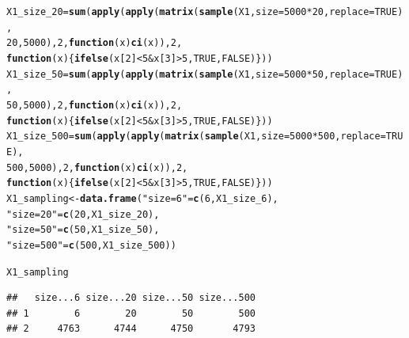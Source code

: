 \documentclass{article}\usepackage[]{graphicx}\usepackage[]{color}
\makeatletter
\newcommand{\hlnum}[1]{\textcolor[rgb]{0.686,0.059,0.569}{#1}}%
\newcommand{\hlstr}[1]{\textcolor[rgb]{0.192,0.494,0.8}{#1}}%
\newcommand{\hlopt}[1]{\textcolor[rgb]{0,0,0}{#1}}%
\newcommand{\hlstd}[1]{\textcolor[rgb]{0.345,0.345,0.345}{#1}}%
\newcommand{\hlkwa}[1]{\textcolor[rgb]{0.161,0.373,0.58}{\textbf{#1}}}%
\newcommand{\hlkwb}[1]{\textcolor[rgb]{0.69,0.353,0.396}{#1}}%
\newcommand{\hlkwc}[1]{\textcolor[rgb]{0.333,0.667,0.333}{#1}}%
\newcommand{\hlkwd}[1]{\textcolor[rgb]{0.737,0.353,0.396}{\textbf{#1}}}%
\newenvironment{kframe}{%
 \def\at@end@of@kframe{}%
 \ifinner\ifhmode%
  \def\at@end@of@kframe{\end{minipage}}%
  \begin{minipage}{\columnwidth}%
 \fi\fi%
 \def\FrameCommand##1{\hskip\@totalleftmargin \hskip-\fboxsep
 \colorbox{shadecolor}{##1}\hskip-\fboxsep
     \hskip-\linewidth \hskip-\@totalleftmargin \hskip\columnwidth}%
 \MakeFramed {\advance\hsize-\width
   \@totalleftmargin\z@ \linewidth\hsize
   \@setminipage}}%
 {\par\unskip\endMakeFramed%
 \at@end@of@kframe}
\newenvironment{knitrout}{}{} %
\makeatother
\begin{document}
\begin{knitrout}
\begin{kframe}
\begin{alltt}
\hlstd{X1_size_20} \hlkwb{=} \hlkwd{sum}\hlstd{(}\hlkwd{apply}\hlstd{(}\hlkwd{apply}\hlstd{(}\hlkwd{matrix}\hlstd{(}\hlkwd{sample}\hlstd{(X1,} \hlkwc{size} \hlstd{=} \hlnum{5000} \hlopt{*}\hlnum{20}\hlstd{,} \hlkwc{replace} \hlstd{=} \hlnum{TRUE}\hlstd{),}
                                   \hlnum{20}\hlstd{,}\hlnum{5000}\hlstd{),} \hlnum{2}\hlstd{,} \hlkwa{function}\hlstd{(}\hlkwc{x}\hlstd{)} \hlkwd{ci}\hlstd{(x)),} \hlnum{2}\hlstd{,}
                      \hlkwa{function}\hlstd{(}\hlkwc{x}\hlstd{)\{}\hlkwd{ifelse}\hlstd{(x[}\hlnum{2}\hlstd{]} \hlopt{<} \hlnum{5} \hlopt{&} \hlstd{x[}\hlnum{3}\hlstd{]} \hlopt{>} \hlnum{5}\hlstd{,} \hlnum{TRUE}\hlstd{,} \hlnum{FALSE}\hlstd{)\}))}
\hlstd{X1_size_50} \hlkwb{=} \hlkwd{sum}\hlstd{(}\hlkwd{apply}\hlstd{(}\hlkwd{apply}\hlstd{(}\hlkwd{matrix}\hlstd{(}\hlkwd{sample}\hlstd{(X1,} \hlkwc{size} \hlstd{=} \hlnum{5000} \hlopt{*}\hlnum{50}\hlstd{,} \hlkwc{replace} \hlstd{=} \hlnum{TRUE}\hlstd{),}
                                   \hlnum{50}\hlstd{,}\hlnum{5000}\hlstd{),} \hlnum{2}\hlstd{,} \hlkwa{function}\hlstd{(}\hlkwc{x}\hlstd{)} \hlkwd{ci}\hlstd{(x)),} \hlnum{2}\hlstd{,}
                      \hlkwa{function}\hlstd{(}\hlkwc{x}\hlstd{)\{}\hlkwd{ifelse}\hlstd{(x[}\hlnum{2}\hlstd{]} \hlopt{<} \hlnum{5} \hlopt{&} \hlstd{x[}\hlnum{3}\hlstd{]} \hlopt{>} \hlnum{5}\hlstd{,} \hlnum{TRUE}\hlstd{,} \hlnum{FALSE}\hlstd{)\}))}
\hlstd{X1_size_500} \hlkwb{=} \hlkwd{sum}\hlstd{(}\hlkwd{apply}\hlstd{(}\hlkwd{apply}\hlstd{(}\hlkwd{matrix}\hlstd{(}\hlkwd{sample}\hlstd{(X1,} \hlkwc{size} \hlstd{=} \hlnum{5000} \hlopt{*}\hlnum{500}\hlstd{,} \hlkwc{replace} \hlstd{=} \hlnum{TRUE}\hlstd{),}
                                   \hlnum{500}\hlstd{,}\hlnum{5000}\hlstd{),} \hlnum{2}\hlstd{,} \hlkwa{function}\hlstd{(}\hlkwc{x}\hlstd{)} \hlkwd{ci}\hlstd{(x)),} \hlnum{2}\hlstd{,}
                      \hlkwa{function}\hlstd{(}\hlkwc{x}\hlstd{)\{}\hlkwd{ifelse}\hlstd{(x[}\hlnum{2}\hlstd{]} \hlopt{<} \hlnum{5} \hlopt{&} \hlstd{x[}\hlnum{3}\hlstd{]} \hlopt{>} \hlnum{5}\hlstd{,} \hlnum{TRUE}\hlstd{,} \hlnum{FALSE}\hlstd{)\}))}
\hlstd{X1_sampling} \hlkwb{<-} \hlkwd{data.frame}\hlstd{(}\hlstr{"size = 6"} \hlstd{=} \hlkwd{c}\hlstd{(}\hlnum{6}\hlstd{, X1_size_6),}
                          \hlstr{"size = 20"} \hlstd{=} \hlkwd{c}\hlstd{(}\hlnum{20}\hlstd{, X1_size_20),}
                          \hlstr{"size = 50"} \hlstd{=} \hlkwd{c}\hlstd{(}\hlnum{50}\hlstd{, X1_size_50),}
                          \hlstr{"size = 500"} \hlstd{=} \hlkwd{c}\hlstd{(}\hlnum{500}\hlstd{, X1_size_500))}

\hlstd{X1_sampling}
\end{alltt}
\begin{verbatim}
##   size...6 size...20 size...50 size...500
## 1        6        20        50        500
## 2     4763      4744      4750       4793
\end{verbatim}
\end{kframe}
\end{knitrout}
\end{document}
